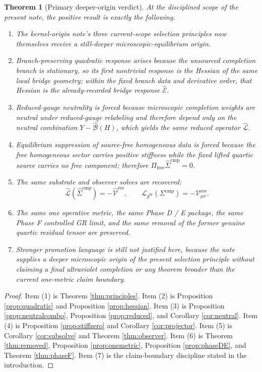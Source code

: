 \documentclass[11pt]{article}
\newcommand{\ObserverMetric}{g^{\mathrm{br}}}
\newcommand{\CompShift}{\Sigma^{\mathrm{cmp}}}
\newcommand{\CompLift}{\widehat\Sigma^{\mathrm{cmp}}}
\newcommand{\ResidualCore}{\mathcal V_{\mu\nu}^{\mathrm{res}}}
\newcommand{\ResidualLift}{\widehat{\mathcal V}^{\mathrm{res}}}
\newcommand{\SubEinLin}{\widehat{\mathcal E}}
\newcommand{\SubGaugeVec}{\widehat{\mathcal B}}
\newcommand{\SubReducedEin}{\widehat{\mathcal L}}
\newcommand{\FreeProj}{\Pi_{\mathrm{free}}}
\newcommand{\GaugeAux}{Y}
\newcommand{\ReducedEin}{\mathcal L_{\ObserverMetric}}
\newtheorem{theorem}{Theorem}
\begin{document}
\begin{theorem}[Primary deeper-origin verdict]
\label{thm:verdict}
At the disciplined scope of the present note, the positive result is exactly the following.
\begin{enumerate}
    \item The kernel-origin note's three current-scope selection principles now themselves receive a still-deeper microscopic-equilibrium origin.
    \item Branch-preserving quadratic response arises because the unsourced completion branch is stationary, so its first nontrivial response is the Hessian of the same local bridge geometry; within the fixed branch data and derivative order, that Hessian is the already-recorded bridge response \(\SubEinLin\).
    \item Reduced-gauge neutrality is forced because microscopic completion weights are neutral under reduced-gauge relabeling and therefore depend only on the neutral combination \(\GaugeAux-\SubGaugeVec(H)\), which yields the same reduced operator \(\SubReducedEin\).
    \item Equilibrium suppression of source-free homogeneous data is forced because the free homogeneous sector carries positive stiffness while the fixed lifted quartic source carries no free component; therefore \(\FreeProj\CompLift=0\).
    \item The same substrate and observer solves are recovered:
    \[
    \SubReducedEin(\CompLift)=-\ResidualLift,
    \qquad
    \ReducedEin(\CompShift)=-\ResidualCore.
    \]
    \item The same one operative metric, the same Phase D / E package, the same Phase F controlled GR limit, and the same removal of the former genuine quartic residual tensor are preserved.
    \item Stronger promotion language is still not justified here, because the note supplies a deeper microscopic origin of the present selection principle without claiming a final ultraviolet completion or any theorem broader than the current one-metric claim boundary.
\end{enumerate}
\end{theorem}

\begin{proof}
Item (1) is Theorem \ref{thm:principles}. Item (2) is Proposition \ref{prop:quadratic} and Proposition \ref{prop:hessian}. Item (3) is Proposition \ref{prop:neutralcombo}, Proposition \ref{prop:reduced}, and Corollary \ref{cor:neutral}. Item (4) is Proposition \ref{prop:stiffzero} and Corollary \ref{cor:projector}. Item (5) is Corollary \ref{cor:subsolve} and Theorem \ref{thm:observer}. Item (6) is Theorem \ref{thm:removed}, Proposition \ref{prop:onemetric}, Proposition \ref{prop:phaseDE}, and Theorem \ref{thm:phaseF}. Item (7) is the claim-boundary discipline stated in the introduction.
\end{proof}
\end{document}
